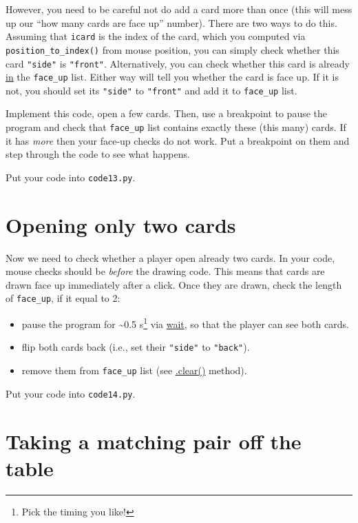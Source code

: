 \documentclass[
]{book}
\providecommand{\tightlist}{%
  \setlength{\itemsep}{0pt}\setlength{\parskip}{0pt}}
\begin{document}
However, you need to be careful not do add a card more than once (this will mess up our ``how many cards are face up'' number). There are two ways to do this. Assuming that \texttt{icard} is the index of the card, which you computed via \texttt{position\_to\_index()} from mouse position, you can simply check whether this card \texttt{"side"} is \texttt{"front"}. Alternatively, you can check whether this card is already \href{https://docs.python.org/3/reference/expressions.html?highlight=list\%20dictionary\#in}{in} the \texttt{face\_up} list. Either way will tell you whether the card is face up. If it is not, you should set its \texttt{"side"} to \texttt{"front"} and add it to \texttt{face\_up} list.

Implement this code, open a few cards. Then, use a breakpoint to pause the program and check that \texttt{face\_up} list contains exactly these (this many) cards. If it has \emph{more} then your face-up checks do not work. Put a breakpoint on them and step through the code to see what happens.

Put your code into \texttt{code13.py}.

\hypertarget{opening-only-two-cards}{%
\section{Opening only two cards}\label{opening-only-two-cards}}

Now we need to check whether a player open already two cards. In your code, mouse checks should be \emph{before} the drawing code. This means that cards are drawn face up immediately after a click. Once they are drawn, check the length of \texttt{face\_up}, if it equal to 2:

\begin{itemize}
\tightlist
\item
  pause the program for \textasciitilde0.5 s\footnote{Pick the timing you like!} via \href{https://psychopy.org/api/clock.html\#psychopy.clock.wait}{wait}, so that the player can see both cards.
\item
  flip both cards back (i.e., set their \texttt{"side"} to \texttt{"back"}).
\item
  remove them from \texttt{face\_up} list (see \href{https://docs.python.org/3/tutorial/datastructures.html\#more-on-lists}{.clear()} method).
\end{itemize}

Put your code into \texttt{code14.py}.

\hypertarget{taking-a-matching-pair-off-the-table}{%
\section{Taking a matching pair off the table}\label{taking-a-matching-pair-off-the-table}}
\end{document}
